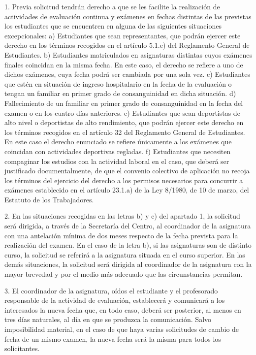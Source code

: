 \documentclass{article}
\begin{document}
\begin{itemize}
\begin{itemize}
\begin{scriptsize}
                  1. Previa solicitud tendrán derecho a que se les facilite la realización de actividades de evaluación continua y exámenes en fechas distintas de las previstas los estudiantes que se encuentren en alguna de las siguientes situaciones excepcionales:
                  a) Estudiantes que sean representantes, que podrán ejercer este derecho en los términos recogidos en el artículo 5.1.e) del Reglamento General de Estudiantes.
                  b) Estudiantes matriculados en asignaturas distintas cuyos exámenes finales coincidan en la misma fecha. En este caso, el derecho se refiere a uno de dichos exámenes, cuya fecha podrá ser cambiada por una sola vez.
                  c) Estudiantes que estén en situación de ingreso hospitalario en la fecha de la evaluación o tengan un familiar en primer grado de consanguinidad en dicha situación.
                  d) Fallecimiento de un familiar en primer grado de consanguinidad en la fecha del examen o en los cuatro días anteriores.
                  e) Estudiantes que sean deportistas de alto nivel o deportistas de alto rendimiento, que podrán ejercer este derecho en los términos recogidos en el artículo 32 del Reglamento General de Estudiantes. En este caso el derecho enunciado se refiere únicamente a los exámenes que coincidan con actividades deportivas regladas.
                  f) Estudiantes que necesiten compaginar los estudios con la actividad laboral en el caso, que deberá ser justificado documentalmente, de que el convenio colectivo de aplicación no recoja los términos del ejercicio del derecho a los permisos necesarios para concurrir a exámenes establecido en el artículo 23.1.a) de la Ley 8/1980, de 10 de marzo, del Estatuto de los Trabajadores.

                  2. En las situaciones recogidas en las letras b) y e) del apartado 1, la solicitud será dirigida, a través de la Secretaría del Centro, al coordinador de la asignatura con una antelación mínima de dos meses respecto de la fecha prevista para la realización del examen. En el caso de la letra b), si las asignaturas son de distinto curso, la solicitud se referirá a la asignatura situada en el curso superior. En las demás situaciones, la solicitud será dirigida al coordinador de la asignatura con la mayor brevedad y por el medio más adecuado que las circunstancias permitan.

                  3. El coordinador de la asignatura, oídos el estudiante y el profesorado responsable de la actividad de evaluación, establecerá y comunicará a los interesados la nueva fecha que, en todo caso, deberá ser posterior, al menos en tres días naturales, al día en que se produzca la comunicación. Salvo imposibilidad material, en el caso de que haya varias solicitudes de cambio de fecha de un mismo examen, la nueva fecha será la misma para todos los solicitantes.


\end{scriptsize}
\end{itemize}
\end{itemize}
\end{document}
